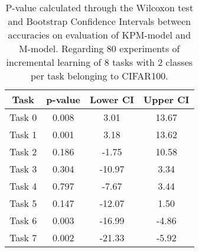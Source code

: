 \begin{table}[H]
\centering
\begin{tabular}{cccc}
\toprule
Task & p-value & Lower CI & Upper CI \\
\midrule
Task 0 & 0.008 &3.01 & 13.67 \\
Task 1 & 0.001 &3.18 & 13.62 \\
Task 2 & 0.186 &-1.75 & 10.58 \\
Task 3 & 0.304 &-10.97 & 3.34 \\
Task 4 & 0.797 &-7.67 & 3.44 \\
Task 5 & 0.147 &-12.07 & 1.50 \\
Task 6 & 0.003 &-16.99 & -4.86 \\
Task 7 & 0.002 &-21.33 & -5.92 \\
\bottomrule
\end{tabular}
\caption{P-value calculated through the Wilcoxon test and Bootstrap Confidence Intervals between accuracies on evaluation of KPM-model and M-model. Regarding 80 experiments of incremental learning of 8 tasks with 2 classes per task belonging to CIFAR100.}
\end{table}
